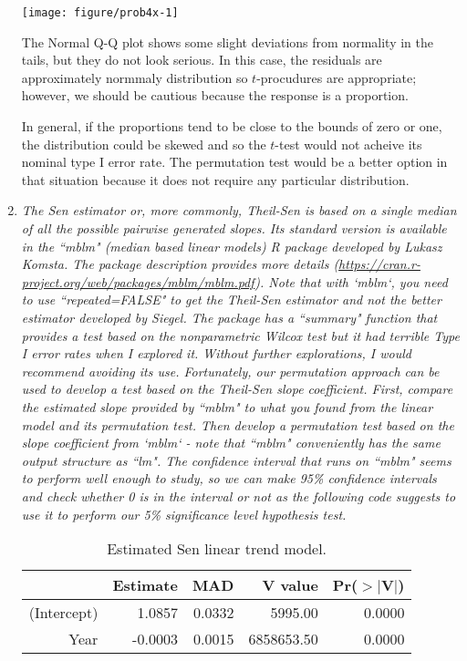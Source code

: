 \documentclass[11pt]{article}\usepackage[]{graphicx}\usepackage[]{color}
\makeatletter
\def\maxwidth{ %
  \ifdim\Gin@nat@width>\linewidth
    \linewidth
  \else
    \Gin@nat@width
  \fi
}
\newenvironment{knitrout}{}{} %
\makeatother
\begin{document}
\begin{enumerate}
\begin{knitrout}\footnotesize
{}\color{fgcolor}

{\centering \texttt{[image: figure/prob4x-1]} 

}



\end{knitrout}

The Normal Q-Q plot shows some slight deviations from normality in the tails, but they do not look serious. In this case, the residuals are approximately normmaly distribution so $t$-procudures are appropriate; however, we should be cautious because the response is a proportion. 

In general, if the proportions tend to be close to the bounds of zero or one, the distribution could be skewed and so the $t$-test would not acheive its nominal type I error rate. The permutation test would be a better option in that situation because it does not require any particular distribution.

\item%
{\it The Sen estimator or, more commonly, Theil-Sen is based on a single median of all the possible pairwise generated slopes. Its standard version is available in the ``mblm" (median based linear models) R package developed by Lukasz Komsta. The package description provides more details (\url{https://cran.r-project.org/web/packages/mblm/mblm.pdf}). Note that with `mblm`, you need to use ``repeated=FALSE" to get the Theil-Sen estimator and not the better estimator developed by Siegel. The package has a ``summary" function that provides a test based on the nonparametric Wilcox test but it had terrible Type I error rates when I explored it. Without further explorations, I would recommend avoiding its use. Fortunately, our permutation approach can be used to develop a test based on the Theil-Sen slope coefficient. First, compare the estimated slope provided by ``mblm" to what you found from the linear model and its permutation test. Then develop a permutation test based on the slope coefficient from `mblm` - note that ``mblm" conveniently has the same output structure as ``lm". The confidence interval that runs on ``mblm" seems to perform well enough to study, so we can make 95\% confidence intervals and check whether 0 is in the interval or not as the following code suggests to use it to perform our 5\% significance level hypothesis test.}

\begin{table}[H]
\centering
\caption{Estimated Sen linear trend model.} 
\begin{tabular}{rrrrr}
  \hline
 & Estimate & MAD & V value & Pr($>$$|$V$|$) \\ 
  \hline
(Intercept) & 1.0857 & 0.0332 & 5995.00 & 0.0000 \\ 
  Year & -0.0003 & 0.0015 & 6858653.50 & 0.0000 \\ 
   \hline
\end{tabular}
\end{table}



\end{enumerate}
\end{document}
